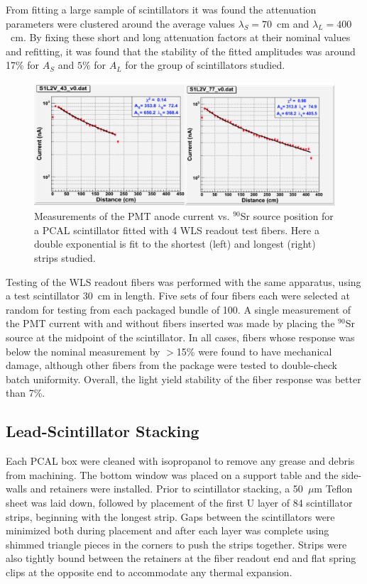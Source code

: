 From fitting a large sample of scintillators it was found the attenuation parameters were clustered around the
average values  $\lambda_S=70$~cm and $\lambda_L=400$~cm. By fixing these short and long attenuation factors
at their nominal values and refitting, it was found that the stability of the fitted amplitudes was around 17\% for
$A_S$ and $5\%$ for $A_L$ for the group of scintillators studied. 

\begin{figure}[hbt]
\centering
\includegraphics[width=1.0\columnwidth,height=0.25\textheight]{img/S5_0.png}
\caption{Measurements of the PMT anode current vs. $^{90}$Sr source position for a PCAL scintillator fitted
  with 4 WLS readout test fibers. Here a double exponential is fit to the shortest (left) and longest (right)
  strips studied.}
\label{fig:S5_0}
\end{figure}

Testing of the WLS readout fibers was performed with the same apparatus, using a test scintillator 30~cm in
length. Five sets of four fibers each were selected at random for testing from each packaged bundle of 100.
A single measurement of the PMT current with and without fibers inserted was made by placing the $^{90}$Sr
source at the midpoint of the scintillator. In all cases, fibers whose response was below the nominal measurement
by $>$15\% were found to have mechanical damage, although other fibers from the package were tested to
double-check batch uniformity. Overall, the light yield stability of the fiber response was better than 7\%.
 
\subsection{Lead-Scintillator Stacking}

Each PCAL box were cleaned with isopropanol to remove any grease and debris from machining. The bottom window
was placed on a support table and the side-walls and retainers were installed. Prior to scintillator stacking, a
50~$\mu$m Teflon sheet was laid down, followed by placement of the first U layer of 84 scintillator strips,
beginning with the longest strip. Gaps between the scintillators were minimized both during placement and after
each layer was complete using shimmed triangle pieces in the corners to push the strips together. Strips were also
tightly bound between the retainers at the fiber readout end and flat spring clips at the opposite end to
accommodate any thermal expansion.

